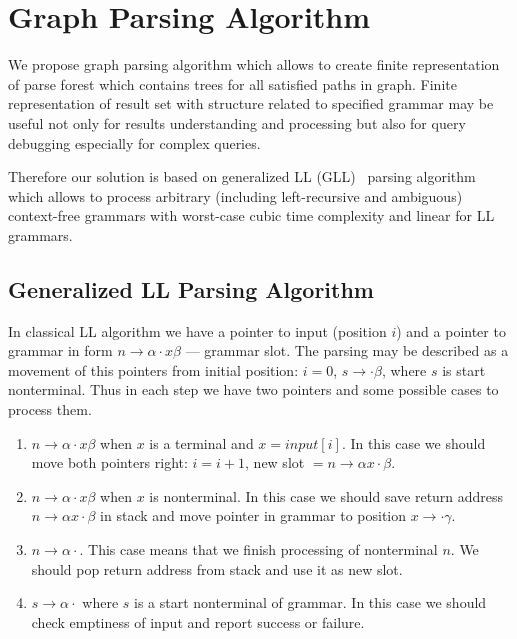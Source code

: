 \section{Graph Parsing Algorithm}

We propose graph parsing algorithm which allows to create finite representation of parse forest which contains trees for all satisfied paths in graph.
Finite representation of result set with structure related to specified grammar may be useful not only for results understanding and processing but also for query debugging especially for complex queries. 

Therefore our solution is based on generalized LL (GLL)~\cite{scott2010gll, FastPracticalGLL} parsing algorithm which allows to process arbitrary (including left-recursive and ambiguous) context-free grammars with worst-case cubic time complexity and linear for LL grammars. 

\subsection{Generalized LL Parsing Algorithm}

In classical LL algorithm we have a pointer to input (position $i$) and a pointer to grammar in form $n \rightarrow \alpha \cdot x \beta $ --- grammar slot.
The parsing may be described as a movement of this pointers from initial position: $i=0$, $s \rightarrow \cdot \beta $, where $s$ is start nonterminal. Thus in each step we have two pointers and some possible cases to process them. 

\begin{enumerate}
\item $n \rightarrow \alpha \cdot x \beta $ when $x$ is a terminal and $x = input[i]$. In this case we should move both pointers right: $i = i + 1$, new slot $= n \rightarrow \alpha  x \cdot \beta $.
\item $n \rightarrow \alpha \cdot x \beta $ when $x$ is nonterminal. In this case we should save return address $n \rightarrow \alpha x \cdot \beta $ in stack and move pointer in grammar to position $x \rightarrow \cdot \gamma$.\label{itm:2}
\item $n \rightarrow \alpha \cdot $. This case means that we finish processing of nonterminal $n$. We should pop return address from stack and use it as new slot.\label{itm:3}
\item $s \rightarrow \alpha \cdot $ where $s$ is a start nonterminal of grammar. In this case we should check emptiness of input and report success or failure. 
\end{enumerate}

